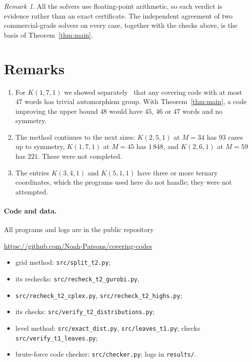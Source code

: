 \documentclass[11pt]{article}
\theoremstyle{remark}
\newtheorem{remark}[theorem]{Remark}
\begin{document}
\begin{remark}
All the solvers use floating-point arithmetic, so each verdict is evidence rather than an exact
certificate. The independent agreement of two commercial-grade solvers on every case, together
with the checks above, is the basis of Theorem~\ref{thm:main}.
\end{remark}

\section{Remarks}

\begin{enumerate}
\item For $K(1,7,1)$ we showed separately~\cite{companion} that any covering code with at most
  $47$ words has trivial automorphism group. With Theorem~\ref{thm:main}, a code improving the
  upper bound $48$ would have $45$, $46$ or $47$ words and no symmetry.
\item The method continues to the next sizes: $K(2,5,1)$ at $M=34$ has $93$ cases up to symmetry,
  $K(1,7,1)$ at $M=45$ has $1\,848$, and $K(2,6,1)$ at $M=59$ has $221$. These were not
  completed.
\item The entries $K(3,4,1)$ and $K(5,1,1)$ have three or more ternary coordinates, which the
  programs used here do not handle; they were not attempted.
\end{enumerate}

\paragraph{Code and data.} All programs and logs are in the public repository
\begin{center}\url{https://github.com/Noah-Parsons/covering-codes}\end{center}
\begin{itemize}
\item grid method: \texttt{src/split\_t2.py};
\item its rechecks: \texttt{src/recheck\_t2\_gurobi.py},
\item[] \hphantom{its rechecks: }\texttt{src/recheck\_t2\_cplex.py}, \texttt{src/recheck\_t2\_highs.py};
\item its checks: \texttt{src/verify\_t2\_distributions.py};
\item level method: \texttt{src/exact\_dist.py}, \texttt{src/leaves\_t1.py};
  checks \texttt{src/verify\_t1\_leaves.py};
\item brute-force code checker: \texttt{src/checker.py}; logs in \texttt{results/}.
\end{itemize}
\end{document}
